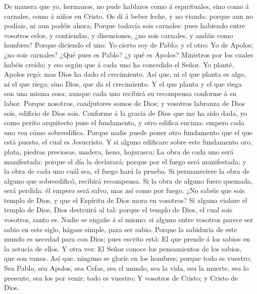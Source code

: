  De manera que yo, hermanos, no pude hablaros como á
espirituales, sino como á carnales, como á niños en Cristo.
 Os dí á beber leche, y no vianda: porque aun no podíais,
ni aun podéis ahora;  Porque todavía sois carnales: pues
habiendo entre vosotros celos, y contiendas, y disensiones, ¿no sois
carnales, y andáis como hombres?  Porque diciendo el uno:
Yo cierto soy de Pablo; y el otro: Yo de Apolos; ¿no sois carnales?
 ¿Qué pues es Pablo? ¿y qué es Apolos? Ministros por los
cuales habéis creído; y eso según que á cada uno ha concedido el Señor.
 Yo planté, Apolos regó: mas Dios ha dado el crecimiento.
 Así que, ni el que planta es algo, ni el que riega; sino
Dios, que da el crecimiento.  Y el que planta y el que
riega son una misma cosa; aunque cada uno recibirá su recompensa
conforme á su labor.  Porque nosotros, coadjutores somos
de Dios; y vosotros labranza de Dios sois, edificio de Dios sois.
 Conforme á la gracia de Dios que me ha sido dada, yo
como perito arquitecto puse el fundamento, y otro edifica encima: empero
cada uno vea cómo sobreedifica.  Porque nadie puede poner
otro fundamento que el que está puesto, el cual es Jesucristo.
 Y si alguno edificare sobre este fundamento oro, plata,
piedras preciosas, madera, heno, hojarasca;  La obra de
cada uno será manifestada: porque el día la declarará; porque por el
fuego será manifestada; y la obra de cada uno cuál sea, el fuego hará la
prueba.  Si permaneciere la obra de alguno que
sobreedificó, recibirá recompensa.  Si la obra de alguno
fuere quemada, será perdida: él empero será salvo, mas así como por
fuego.  ¿No sabéis que sois templo de Dios, y que el
Espíritu de Dios mora en vosotros?  Si alguno violare el
templo de Dios, Dios destruirá al tal: porque el templo de Dios, el cual
sois vosotros, santo es.  Nadie se engañe á sí mismo: si
alguno entre vosotros parece ser sabio en este siglo, hágase simple,
para ser sabio.  Porque la sabiduría de este mundo es
necedad para con Dios; pues escrito está: El que prende á los sabios en
la astucia de ellos.  Y otra vez: El Señor conoce los
pensamientos de los sabios, que son vanos.  Así que,
ninguno se gloríe en los hombres; porque todo es vuestro;
 Sea Pablo, sea Apolos, sea Cefas, sea el mundo, sea la
vida, sea la muerte, sea lo presente, sea los por venir; todo es
vuestro;  Y vosotros de Cristo; y Cristo de Dios.

